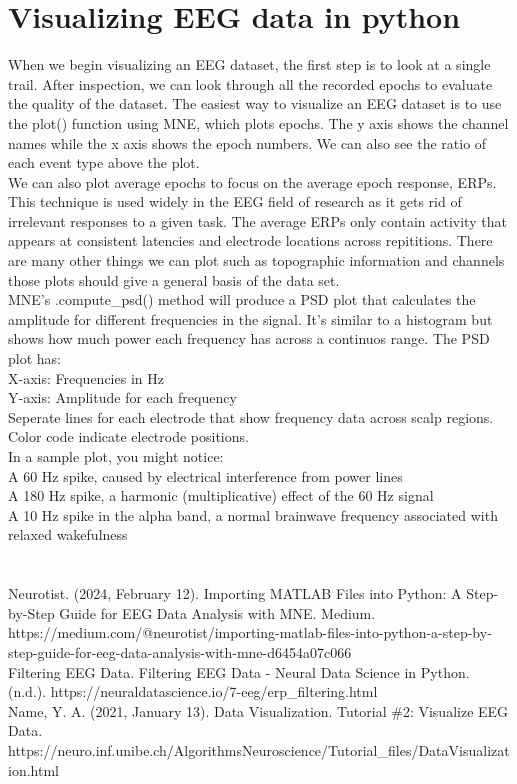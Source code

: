 \documentclass{article}
\begin{document}
\section{Visualizing EEG data in python}
When we begin visualizing an EEG dataset, the first step is to look at a single trail. After inspection, we can look through all the recorded epochs to evaluate the quality of the dataset. The easiest way to visualize an EEG dataset is to use the plot() function using MNE, which plots epochs. The y axis shows the channel names while the x axis shows the epoch numbers. We can also see the ratio of each event type above the plot. \\
We can also plot average epochs to focus on the average epoch response, ERPs. This technique is used widely in the EEG field of research as it gets rid of irrelevant responses to a given task. The average ERPs only contain activity that appears at consistent latencies and electrode locations across repititions. There are many other things we can plot such as topographic information and channels those plots should give a general basis of the data set. \\
MNE's .compute\_psd() method will produce a PSD plot that calculates the amplitude for different frequencies in the signal. It's similar to a histogram but shows how much power each frequency has across a continuos range. The PSD plot has: \\
X-axis: Frequencies in Hz \\
Y-axis: Amplitude for each frequency \\
Seperate lines for each electrode that show frequency data across scalp regions. Color code indicate electrode positions.\\
In a sample plot, you might notice:\\
A 60 Hz spike, caused by electrical interference from power lines\\
A 180 Hz spike, a harmonic (multiplicative) effect of the 60 Hz signal\\
A 10 Hz spike in the alpha band, a normal brainwave frequency associated with relaxed wakefulness \\ \\ \\




Neurotist. (2024, February 12). Importing MATLAB Files into Python: A Step-by-Step Guide for EEG Data Analysis with MNE. Medium. https://medium.com/@neurotist/importing-matlab-files-into-python-a-step-by-step-guide-for-eeg-data-analysis-with-mne-d6454a07c066\\

Filtering EEG Data. Filtering EEG Data - Neural Data Science in Python. (n.d.). https://neuraldatascience.io/7-eeg/erp\_filtering.html \\

Name, Y. A. (2021, January 13). Data Visualization. Tutorial \#2: Visualize EEG Data. https://neuro.inf.unibe.ch/AlgorithmsNeuroscience/Tutorial\_files/DataVisualization.html
\end{document}
